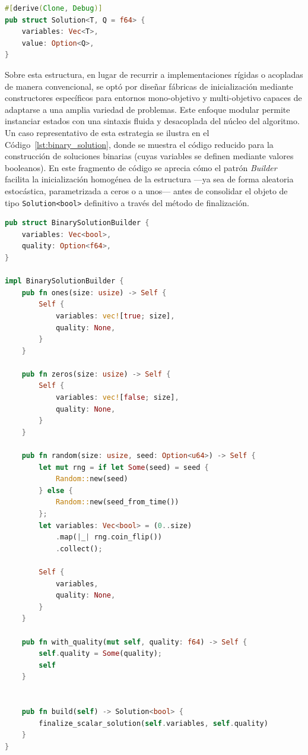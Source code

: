 \documentclass[12pt,a4paper,twoside,openright]{book}
\begin{document}
    \noindent
    \begin{samepage}
    \begin{lstlisting}[language=Rust, caption={Estructura desarrollada para las Soluciones}, label={lst:solution}]
#[derive(Clone, Debug)]
pub struct Solution<T, Q = f64> {
    variables: Vec<T>,
    value: Option<Q>,
}
    \end{lstlisting}
    \end{samepage}

        Sobre esta estructura, en lugar de recurrir a implementaciones rígidas o acopladas de manera convencional, se optó por diseñar fábricas de inicialización mediante constructores específicos para entornos mono-objetivo y multi-objetivo capaces de adaptarse a una amplia variedad de problemas. Este enfoque modular permite instanciar estados con una sintaxis fluida y desacoplada del núcleo del algoritmo. Un caso representativo de esta estrategia se ilustra en el Código~\ref{lst:binary_solution}, donde se muestra el código reducido para la construcción de soluciones binarias (cuyas variables se definen mediante valores booleanos). En este fragmento de código se aprecia cómo el patrón \textit{Builder} facilita la inicialización homogénea de la estructura —ya sea de forma aleatoria estocástica, parametrizada a ceros o a unos— antes de consolidar el objeto de tipo \texttt{Solution<bool>} definitivo a través del método de finalización.

\begin{lstlisting}[language=Rust, caption={Código reducido sobre el constructor de soluciones o permutaciones binarias}, label={lst:binary_solution}]
pub struct BinarySolutionBuilder {
    variables: Vec<bool>,
    quality: Option<f64>,
}

impl BinarySolutionBuilder {
    pub fn ones(size: usize) -> Self {
        Self {
            variables: vec![true; size],
            quality: None,
        }
    }

    pub fn zeros(size: usize) -> Self {
        Self {
            variables: vec![false; size],
            quality: None,
        }
    }

    pub fn random(size: usize, seed: Option<u64>) -> Self {
        let mut rng = if let Some(seed) = seed {
            Random::new(seed)
        } else {
            Random::new(seed_from_time())
        };
        let variables: Vec<bool> = (0..size)
            .map(|_| rng.coin_flip())
            .collect();
            
        Self {
            variables,
            quality: None,
        }
    }

    pub fn with_quality(mut self, quality: f64) -> Self {
        self.quality = Some(quality);
        self
    }


    pub fn build(self) -> Solution<bool> {
        finalize_scalar_solution(self.variables, self.quality)
    }
}
\end{lstlisting}
\end{document}
